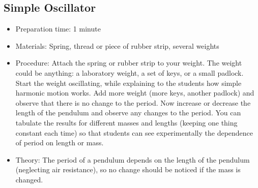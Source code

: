 \subsection{Simple Oscillator}
\begin{itemize}
\item{Preparation time: 1 minute}
\item{Materials: Spring, thread or piece of rubber strip, several weights}
\item{Procedure: Attach the spring or rubber strip to your weight. The weight could be anything: a laboratory weight, a set of keys, or a small padlock. Start the weight oscillating, while explaining to the students how simple harmonic motion works. Add more weight (more keys, another padlock) and observe that there is no change to the period. Now increase or decrease the length of the pendulum and observe any changes to the period. You can tabulate the results for different masses and lengths (keeping one thing constant each time) so that students can see experimentally the dependence of period on length or mass.}
\item{Theory: The period of a pendulum depends on the length of the pendulum (neglecting air resistance), so no change should be noticed if the mass is changed.}
\end{itemize}

